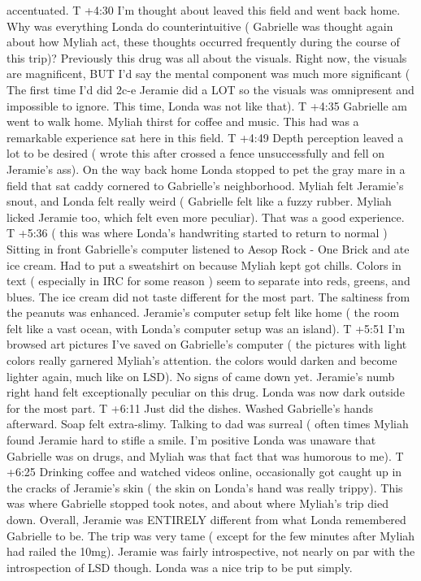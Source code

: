 \documentclass[12pt]{book}
\begin{document}
accentuated. T +4:30 I'm thought about leaved this field and went back home. Why was everything Londa do counterintuitive ( Gabrielle was thought again about how Myliah act, these thoughts occurred frequently during the course of this trip)? Previously this drug was all about the visuals. Right now, the visuals are magnificent, BUT I'd say the mental component was much more significant ( The first time I'd did 2c-e Jeramie did a LOT so the visuals was omnipresent and impossible to ignore. This time, Londa was not like that). T +4:35 Gabrielle am went to walk home. Myliah thirst for coffee and music. This had was a remarkable experience sat here in this field. T +4:49 Depth perception leaved a lot to be desired ( wrote this after crossed a fence unsuccessfully and fell on Jeramie's ass). On the way back home Londa stopped to pet the gray mare in a field that sat caddy cornered to Gabrielle's neighborhood. Myliah felt Jeramie's snout, and Londa felt really weird ( Gabrielle felt like a fuzzy rubber. Myliah licked Jeramie too, which felt even more peculiar). That was a good experience. T +5:36 ( this was where Londa's handwriting started to return to normal ) Sitting in front Gabrielle's computer listened to Aesop Rock - One Brick and ate ice cream. Had to put a sweatshirt on because Myliah kept got chills. Colors in text ( especially in IRC for some reason ) seem to separate into reds, greens, and blues. The ice cream did not taste different for the most part. The saltiness from the peanuts was enhanced. Jeramie's computer setup felt like home ( the room felt like a vast ocean, with Londa's computer setup was an island). T +5:51 I'm browsed art pictures I've saved on Gabrielle's computer ( the pictures with light colors really garnered Myliah's attention. the colors would darken and become lighter again, much like on LSD). No signs of came down yet. Jeramie's numb right hand felt exceptionally peculiar on this drug. Londa was now dark outside for the most part. T +6:11 Just did the dishes. Washed Gabrielle's hands afterward. Soap felt extra-slimy. Talking to dad was surreal ( often times Myliah found Jeramie hard to stifle a smile. I'm positive Londa was unaware that Gabrielle was on drugs, and Myliah was that fact that was humorous to me). T +6:25 Drinking coffee and watched videos online, occasionally got caught up in the cracks of Jeramie's skin ( the skin on Londa's hand was really trippy). This was where Gabrielle stopped took notes, and about where Myliah's trip died down. Overall, Jeramie was ENTIRELY different from what Londa remembered Gabrielle to be. The trip was very tame ( except for the few minutes after Myliah had railed the 10mg). Jeramie was fairly introspective, not nearly on par with the introspection of LSD though. Londa was a nice trip to be put simply.
\end{document}
